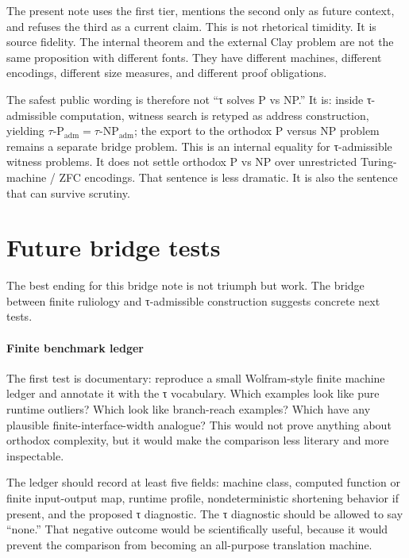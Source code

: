 \documentclass{pantarhei-researchnote}
\newcommand{\Padm}{\ensuremath{\tau\text{-}\mathrm{P}_{\mathrm{adm}}}}
\newcommand{\NPadm}{\ensuremath{\tau\text{-}\mathrm{NP}_{\mathrm{adm}}}}
\newcommand{\ClassP}{\ensuremath{\mathrm{P}}}
\newcommand{\ClassNP}{\ensuremath{\mathrm{NP}}}
\begin{document}
The present note uses the first tier, mentions the second only as future
context, and refuses the third as a current claim. This is not rhetorical
timidity. It is source fidelity. The internal theorem and the external
Clay problem are not the same proposition with different fonts. They have
different machines, different encodings, different size measures, and
different proof obligations.

The safest public wording is therefore not ``τ solves P vs NP.'' It is:
inside τ-admissible computation, witness search is retyped as address
construction, yielding \(\Padm=\NPadm\); the export to the orthodox
\(\ClassP\) versus \(\ClassNP\) problem remains a separate bridge
problem. This is an internal equality for τ-admissible witness problems.
It does not settle orthodox P vs NP over unrestricted Turing-machine /
ZFC encodings. That sentence is less dramatic. It is also the sentence
that can survive scrutiny.

\section{Future bridge tests}
\label{sec:future-tests}

The best ending for this bridge note is not triumph but work. The bridge
between finite ruliology and τ-admissible construction suggests concrete
next tests.

\paragraph{Finite benchmark ledger}
The first test is documentary: reproduce a small Wolfram-style finite
machine ledger and annotate it with the τ vocabulary. Which examples look
like pure runtime outliers? Which look like branch-reach examples? Which
have any plausible finite-interface-width analogue? This would not prove
anything about orthodox complexity, but it would make the comparison less
literary and more inspectable.

The ledger should record at least five fields: machine class, computed
function or finite input-output map, runtime profile, nondeterministic
shortening behavior if present, and the proposed τ diagnostic. The τ
diagnostic should be allowed to say ``none.'' That negative outcome would
be scientifically useful, because it would prevent the comparison from
becoming an all-purpose translation machine.
\end{document}
